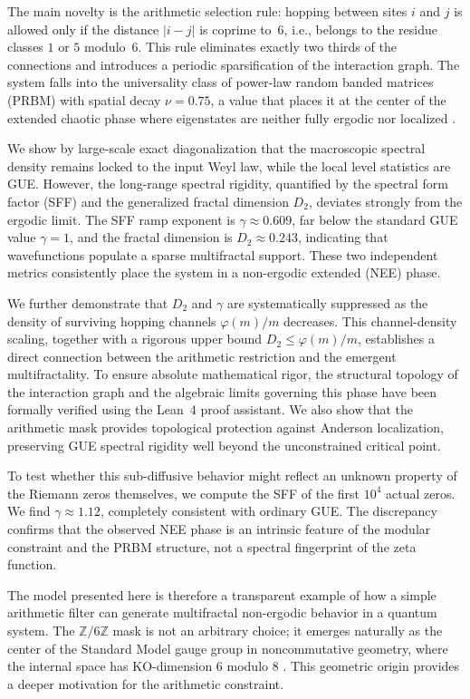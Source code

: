 \documentclass[11pt,a4paper]{article}
\begin{document}
The main novelty is the arithmetic selection rule: hopping between sites $i$ and $j$ is allowed only if the distance $|i-j|$ is coprime to~6, i.e., belongs to the residue classes $1$ or $5$ modulo~6. This rule eliminates exactly two thirds of the connections and introduces a periodic sparsification of the interaction graph. The system falls into the universality class of power-law random banded matrices (PRBM) with spatial decay $\nu=0.75$, a value that places it at the center of the extended chaotic phase where eigenstates are neither fully ergodic nor localized \cite{Mirlin1996}.

We show by large-scale exact diagonalization that the macroscopic spectral density remains locked to the input Weyl law, while the local level statistics are GUE. However, the long-range spectral rigidity, quantified by the spectral form factor (SFF) and the generalized fractal dimension $D_2$, deviates strongly from the ergodic limit. The SFF ramp exponent is $\gamma \approx 0.609$, far below the standard GUE value $\gamma=1$, and the fractal dimension is $D_2 \approx 0.243$, indicating that wavefunctions populate a sparse multifractal support. These two independent metrics consistently place the system in a non-ergodic extended (NEE) phase.

We further demonstrate that $D_2$ and $\gamma$ are systematically suppressed as the density of surviving hopping channels $\varphi(m)/m$ decreases. This channel-density scaling, together with a rigorous upper bound $D_2 \le \varphi(m)/m$, establishes a direct connection between the arithmetic restriction and the emergent multifractality. To ensure absolute mathematical rigor, the structural topology of the interaction graph and the algebraic limits governing this phase have been formally verified using the Lean~4 proof assistant. We also show that the arithmetic mask provides topological protection against Anderson localization, preserving GUE spectral rigidity well beyond the unconstrained critical point.

To test whether this sub-diffusive behavior might reflect an unknown property of the Riemann zeros themselves, we compute the SFF of the first $10^4$ actual zeros. We find $\gamma \approx 1.12$, completely consistent with ordinary GUE. The discrepancy confirms that the observed NEE phase is an intrinsic feature of the modular constraint and the PRBM structure, not a spectral fingerprint of the zeta function.

The model presented here is therefore a transparent example of how a simple arithmetic filter can generate multifractal non-ergodic behavior in a quantum system. The $\mathbb{Z}/6\mathbb{Z}$ mask is not an arbitrary choice; it emerges naturally as the center of the Standard Model gauge group in noncommutative geometry, where the internal space has KO-dimension 6 modulo 8 \cite{Connes2008,Chamseddine2007}. This geometric origin provides a deeper motivation for the arithmetic constraint.
\end{document}
